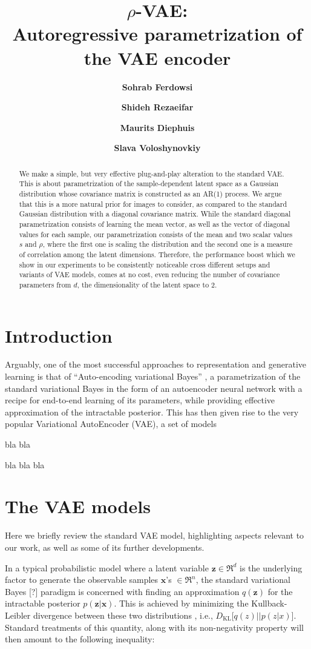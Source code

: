 \documentclass{article}
\title{$\rho$-VAE: \\Autoregressive parametrization of the VAE encoder}
\author{\textbf{Sohrab Ferdowsi}}
\author{\textbf{Shideh Rezaeifar}}
\author{\textbf{Maurits Diephuis}}
\author{\textbf{Slava Voloshynovkiy}}
\affil{
Department of Computer Science, University of Geneva, Switzerland \authorcr
  \{\tt sohrab.ferdowsi, shideh.rezaeifar, maurits.diephuis, svolos\}@unige.ch}
\begin{document}
\maketitle

\begin{abstract}
We make a simple, but very effective plug-and-play alteration to the standard VAE. This is about parametrization of the sample-dependent latent space as a Gaussian distribution whose covariance matrix is constructed as an AR(1) process. We argue that this is a more natural prior for images to consider, as compared to the standard Gaussian distribution with a diagonal covariance matrix. While the standard diagonal parametrization consists of learning the mean vector, as well as the vector of diagonal values for each sample, our parametrization consists of the mean and two scalar values $s$ and $\rho$, where the first one is scaling the distribution and the second one is a measure of correlation among the latent dimensions. Therefore, the performance boost which we show in our experiments to be consistently noticeable cross different setups and variants of VAE models, comes at no cost, even reducing the number of covariance parameters from $d$, the dimensionality of the latent space to $2$.

\end{abstract}

\section{Introduction}
Arguably, one of the most successful approaches to representation and generative learning is that of ``Auto-encoding variational Bayes'' \cite{VAE}, a parametrization of the standard variational Bayes in the form of an autoencoder neural network with a recipe for end-to-end learning of its parameters, while providing effective approximation of the intractable posterior. This has then given rise to the very popular Variational AutoEncoder (VAE), a set of models

bla bla

bla bla bla


\section{The VAE models}
Here we briefly review the standard VAE model, highlighting aspects relevant to our work, as well as some of its further developments.

In a typical probabilistic model where a latent variable $\mathbf{z} \in \Re^d$ is the underlying factor to generate the observable samples $\mathbf{x}$'s $\in \Re^n$, the standard variational Bayes [?] paradigm is concerned with finding an approximation $q(\mathbf{z})$ for the intractable posterior $p(\mathbf{z}|\mathbf{x})$. This is achieved by minimizing the Kullback-Leibler divergence between these two distributions , i.e., $D_{\text{KL}}\Big[ q(z) || p(z|x) \Big]$. Standard treatments of this quantity, along with its non-negativity property will then amount to the following inequality:
\end{document}
